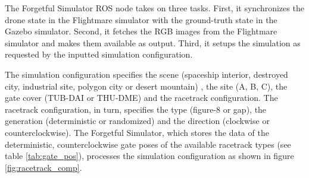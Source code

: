 The Forgetful Simulator ROS node takes on three tasks.
First, it synchronizes the
drone state in the Flightmare simulator with the
ground-truth state in the Gazebo simulator.
Second, it fetches the RGB images from the Flightmare simulator
and makes them available as output.
Third, it setups the simulation
as requested by the inputted 
simulation configuration.

The simulation configuration specifies the scene
(spaceship interior,
destroyed city,
industrial site,
polygon city or
desert mountain)
, the site (A, B, C),
the gate cover (TUB-DAI or THU-DME) and the racetrack configuration.
The racetrack configuration, in turn, specifies 
the type (figure-8 or gap), the generation (deterministic or randomized) 
and the direction (clockwise or counterclockwise).
The Forgetful Simulator, 
which stores the data of the deterministic, 
counterclockwise gate poses
of the available racetrack types (see table \ref{tab:gate_pos}), 
processes the simulation configuration as shown in figure
\ref{fig:racetrack_comp}.


